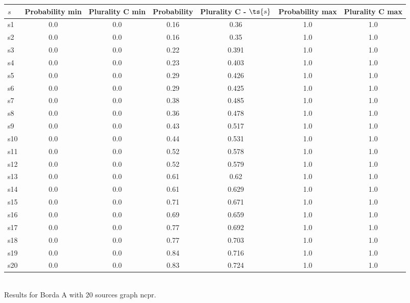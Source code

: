 \documentclass{article}
\begin{document}
\noindent\begin{tabular}{|l|c|c|c|c|c|c|}
\hline
$s$& Probability min & Plurality C min & Probability & Plurality C - $\ts{s}$ & Probability max & Plurality C max\\
\hline
s1 &0.0 & 0.0 & 0.16 & 0.36 & 1.0 & 1.0\\
\hline
s2 &0.0 & 0.0 & 0.16 & 0.35 & 1.0 & 1.0\\
\hline
s3 &0.0 & 0.0 & 0.22 & 0.391 & 1.0 & 1.0\\
\hline
s4 &0.0 & 0.0 & 0.23 & 0.403 & 1.0 & 1.0\\
\hline
s5 &0.0 & 0.0 & 0.29 & 0.426 & 1.0 & 1.0\\
\hline
s6 &0.0 & 0.0 & 0.29 & 0.425 & 1.0 & 1.0\\
\hline
s7 &0.0 & 0.0 & 0.38 & 0.485 & 1.0 & 1.0\\
\hline
s8 &0.0 & 0.0 & 0.36 & 0.478 & 1.0 & 1.0\\
\hline
s9 &0.0 & 0.0 & 0.43 & 0.517 & 1.0 & 1.0\\
\hline
s10 &0.0 & 0.0 & 0.44 & 0.531 & 1.0 & 1.0\\
\hline
s11 &0.0 & 0.0 & 0.52 & 0.578 & 1.0 & 1.0\\
\hline
s12 &0.0 & 0.0 & 0.52 & 0.579 & 1.0 & 1.0\\
\hline
s13 &0.0 & 0.0 & 0.61 & 0.62 & 1.0 & 1.0\\
\hline
s14 &0.0 & 0.0 & 0.61 & 0.629 & 1.0 & 1.0\\
\hline
s15 &0.0 & 0.0 & 0.71 & 0.671 & 1.0 & 1.0\\
\hline
s16 &0.0 & 0.0 & 0.69 & 0.659 & 1.0 & 1.0\\
\hline
s17 &0.0 & 0.0 & 0.77 & 0.692 & 1.0 & 1.0\\
\hline
s18 &0.0 & 0.0 & 0.77 & 0.703 & 1.0 & 1.0\\
\hline
s19 &0.0 & 0.0 & 0.84 & 0.716 & 1.0 & 1.0\\
\hline
s20 &0.0 & 0.0 & 0.83 & 0.724 & 1.0 & 1.0\\
\hline
\end{tabular}\\

\noindent Results for Borda A with 20 sources graph ncpr.
\end{document}
